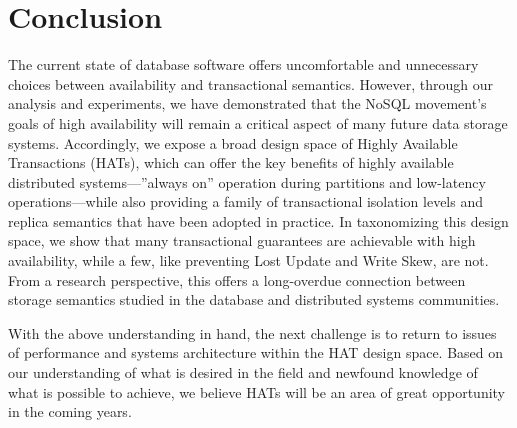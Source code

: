 
\section{Conclusion}
The current state of database software offers uncomfortable and
unnecessary choices between availability and transactional semantics.
However, through our analysis and experiments, we have demonstrated
that the NoSQL movement's goals of high availability will remain a
critical aspect of many future data storage systems. Accordingly, we
expose a broad design space of Highly Available Transactions (HATs),
which can offer the key benefits of highly available distributed
systems---''always on'' operation during partitions and low-latency
operations---while also providing a family of transactional isolation
levels and replica semantics that have been adopted in practice.  In
taxonomizing this design space, we show that many transactional
guarantees are achievable with high availability, while a few, like
preventing Lost Update and Write Skew, are not. From a research
perspective, this offers a long-overdue connection between storage
semantics studied in the database and distributed systems communities.

With the above understanding in hand, the next challenge is to return
to issues of performance and systems architecture within the HAT
design space.  Based on our understanding of what is desired in the
field and newfound knowledge of what is possible to achieve, we
believe HATs will be an area of great opportunity in the coming years.



